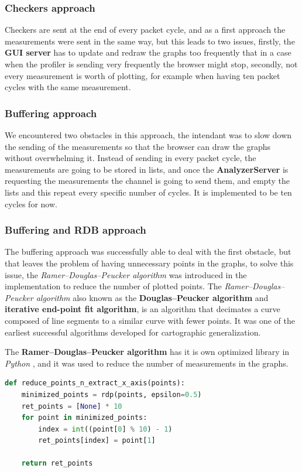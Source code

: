 \subsubsection{Checkers approach}
Checkers are sent at the end of every packet cycle, and as a first approach the measurements were sent
in the same way, but this leads to two issues, firstly, the \textbf{GUI server} has to update and redraw
the graphs too frequently that in a case when the profiler is sending very frequently the browser might
stop, secondly, not every measurement is worth of plotting, for example when having ten packet cycles with
the same measurement.

\subsubsection{Buffering approach}
We encountered two obstacles in this approach, the intendant was to slow down the sending of the measurements
so that the browser can draw the graphs without overwhelming it. Instead of sending in every packet cycle,
the measurements are going to be stored in lists, and once the \textbf{AnalyzerServer} is requesting the measurements
the channel is going to send them, and empty the lists and this repeat every specific number of cycles. It is
implemented to be ten cycles for now.

\subsubsection{Buffering and RDB approach}\label{sec:buffering_rdb}
The buffering approach was successfully able to deal with the first obstacle, but that leaves the problem of
having unnecessary points in the graphs, to solve this issue, the \textit{Ramer–Douglas–Peucker algorithm} was introduced
in the implementation to reduce the number of plotted points. The \textit{Ramer–Douglas–Peucker algorithm}
also known as the \textbf{Douglas–Peucker algorithm} and \textbf{iterative end-point fit algorithm}, 
is an algorithm that decimates a curve composed of line segments to a similar curve with fewer points. 
It was one of the earliest successful algorithms developed for cartographic generalization. \cite{rdp}

The \textbf{Ramer–Douglas–Peucker algorithm} has it is own optimized library in \textit{Python} \cite{rdp_library},
and it was used to reduce the number of measurements in the graphs.
\newline
\begin{lstlisting}[language=Python, label=code:rdp, caption={Using rdp to reduce points},captionpos=b]
def reduce_points_n_extract_x_axis(points):
    minimized_points = rdp(points, epsilon=0.5)
    ret_points = [None] * 10
    for point in minimized_points:
        index = int((point[0] % 10) - 1)
        ret_points[index] = point[1]

    return ret_points
\end{lstlisting}

